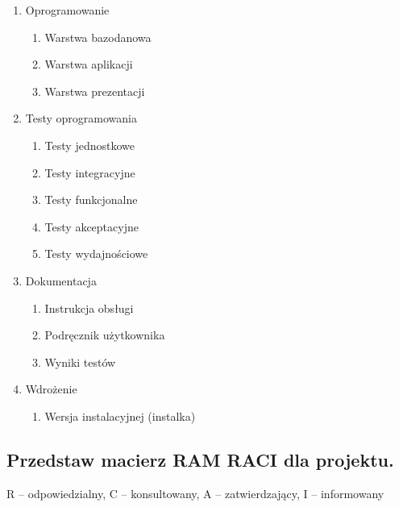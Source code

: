 \begin{enumerate}
\begin{enumerate}
\item Oprogramowanie

\begin{enumerate}

\item Warstwa bazodanowa
\item Warstwa aplikacji
\item Warstwa prezentacji

\end{enumerate}

\item Testy oprogramowania

\begin{enumerate}

\item Testy jednostkowe
\item Testy integracyjne
\item Testy funkcjonalne
\item Testy akceptacyjne
\item Testy wydajnościowe

\end{enumerate}

\item Dokumentacja

\begin{enumerate}

\item Instrukcja obsługi
\item Podręcznik użytkownika
\item Wyniki testów

\end{enumerate}

\item Wdrożenie

\begin{enumerate}

\item Wersja instalacyjnej (instalka)

\end{enumerate}
\end{enumerate}
\end{enumerate}

\clearpage

\subsection*{Przedstaw macierz RAM RACI dla projektu.}

R – odpowiedzialny, C – konsultowany, A – zatwierdzający, I – informowany

